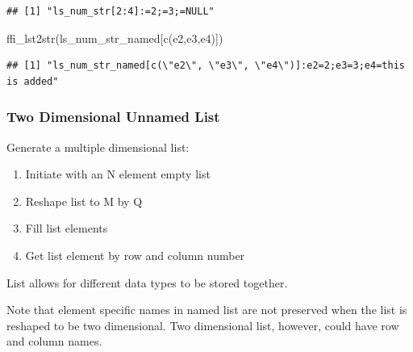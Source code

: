 \documentclass[
]{book}
\newenvironment{Shaded}{\begin{snugshade}}{\end{snugshade}}
\newcommand{\FunctionTok}[1]{\textcolor[rgb]{0.00,0.00,0.00}{#1}}
\newcommand{\NormalTok}[1]{#1}
\newcommand{\StringTok}[1]{\textcolor[rgb]{0.31,0.60,0.02}{#1}}
\providecommand{\tightlist}{%
  \setlength{\itemsep}{0pt}\setlength{\parskip}{0pt}}
\begin{document}
\begin{verbatim}
## [1] "ls_num_str[2:4]:=2;=3;=NULL"
\end{verbatim}

\begin{Shaded}
\begin{Highlighting}[]
\FunctionTok{ffi\_lst2str}\NormalTok{(ls\_num\_str\_named[}\FunctionTok{c}\NormalTok{(}\StringTok{\textquotesingle{}e2\textquotesingle{}}\NormalTok{,}\StringTok{\textquotesingle{}e3\textquotesingle{}}\NormalTok{,}\StringTok{\textquotesingle{}e4\textquotesingle{}}\NormalTok{)])}
\end{Highlighting}
\end{Shaded}

\begin{verbatim}
## [1] "ls_num_str_named[c(\"e2\", \"e3\", \"e4\")]:e2=2;e3=3;e4=this is added"
\end{verbatim}

\hypertarget{two-dimensional-unnamed-list}{%
\subsubsection{Two Dimensional Unnamed List}\label{two-dimensional-unnamed-list}}

Generate a multiple dimensional list:

\begin{enumerate}
\def\labelenumi{\arabic{enumi}.}
\tightlist
\item
  Initiate with an N element empty list
\item
  Reshape list to M by Q
\item
  Fill list elements
\item
  Get list element by row and column number
\end{enumerate}

List allows for different data types to be stored together.

Note that element specific names in named list are not preserved when the list is reshaped to be two dimensional. Two dimensional list, however, could have row and column names.
\end{document}
